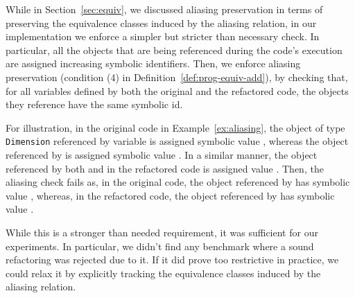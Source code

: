 \documentclass[10pt,conference]{IEEEtran}
\begin{document}
While in Section~\ref{sec:equiv}, we discussed aliasing preservation in terms of
preserving the equivalence classes induced by the aliasing relation,
in our implementation we enforce a simpler but stricter  than necessary check.
In particular, all the objects
that are being referenced during the code's execution
are assigned increasing symbolic identifiers.
Then, we enforce aliasing preservation (condition (4) in Definition~\ref{def:prog-equiv-add}),
by checking that, for all variables defined by both the original and the refactored code,
the objects they reference have the same symbolic id.

For illustration, in the original code in Example~\ref{ex:aliasing}, the object of type \texttt{Dimension} referenced by variable 
is assigned symbolic value , whereas the object referenced by  is assigned symbolic value .
In a similar manner, the object referenced by both  and  in the refactored code is assigned value .
Then, the aliasing check fails as, in the original code, the object referenced by  has symbolic value ,
whereas, in the refactored code, the object referenced by  has symbolic value .

While this is a  stronger than needed requirement, it was sufficient for our experiments.
In particular, we didn't find any benchmark where a sound refactoring
was rejected due to it.
If it did prove too restrictive in practice, we could
relax it by explicitly tracking the equivalence classes induced by the aliasing
relation.



\end{document}
